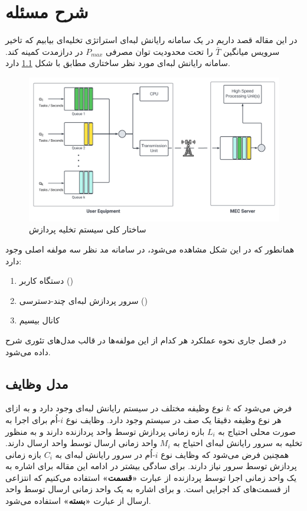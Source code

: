 \chapter{شرح مسئله}
در این مقاله قصد داریم در یک سامانه رایانش لبه‌ای استراتژی تخلیه‌ای بیابیم که تاخیر سرویس میانگین $\bar{T}$ را تحت محدودیت توان مصرفی $P_{m a x}$ در درازمدت کمینه کند. سامانه رایانش لبه‌ای مورد نظر ساختاری مطابق با شکل \ref{fig-offloading-system} دارد.
\begin{figure}[H]
	\centering
	\includegraphics*[width=\textwidth]{figures/MEC5.png}
	\caption{ساختار کلی سیستم تخلیه پردازش}
	\label{fig-offloading-system}
\end{figure}
\newpage
همانطور که در این شکل مشاهده می‌شود، در سامانه مد نظر سه مولفه اصلی وجود دارد:
\begin{enumerate}
	\item دستگاه کاربر ()
	\item سرور پردازش لبه‌ای چند-دسترسی ()
	\item کانال بیسیم
\end{enumerate}
در فصل جاری نحوه عملکرد هر کدام از این مولفه‌ها در قالب مدل‌های تئوری شرح داده می‌شود.

\section{مدل وظایف}
فرض می‌شود که \(k\) نوع وظیفه مختلف در سیستم رایانش لبه‌ای وجود دارد و به ازای هر نوع وظیفه دقیقا یک صف در سیستم وجود دارد. وظایف نوع \(i\)-اُم برای اجرا به صورت محلی احتیاج به \(L_i\) بازه زمانی پردازش توسط واحد پردازنده دارند و به منظور تخلیه به سرور رایانش لبه‌ای احتیاج به \(M_i\) واحد زمانی ارسال توسط واحد ارسال دارند. همچنین فرض می‌شود که وظایف نوع \(i\)-اُم در سرور رایانش لبه‌ای به \(C_i\) بازه زمانی پردازش توسط سرور نیاز دارند. برای سادگی بیشتر در ادامه این مقاله برای اشاره به یک واحد زمانی اجرا توسط پردازنده از عبارت \textbf{«قسمت»} استفاده می‌کنیم که انتزاعی از قسمت‌های کد اجرایی است. و برای اشاره به یک واحد زمانی ارسال توسط واحد ارسال از عبارت\textbf{ «بسته» }استفاده می‌شود.
\newpage
